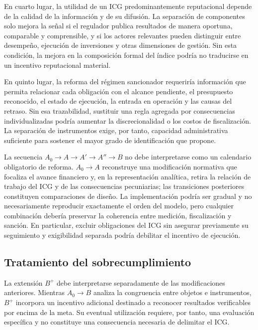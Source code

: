 En cuarto lugar, la utilidad de un ICG predominantemente reputacional depende de la calidad de la información y de su difusión. La separación de componentes solo mejora la señal si el regulador publica resultados de manera oportuna, comparable y comprensible, y si los actores relevantes pueden distinguir entre desempeño, ejecución de inversiones y otras dimensiones de gestión. Sin esta condición, la mejora en la composición formal del índice podría no traducirse en un incentivo reputacional material.

En quinto lugar, la reforma del régimen sancionador requeriría información que permita relacionar cada obligación con el alcance pendiente, el presupuesto reconocido, el estado de ejecución, la entrada en operación y las causas del retraso. Sin esa trazabilidad, sustituir una regla agregada por consecuencias individualizadas podría aumentar la discrecionalidad o los costos de fiscalización. La separación de instrumentos exige, por tanto, capacidad administrativa suficiente para sostener el mayor grado de identificación que propone.

La secuencia \(A_{0}\rightarrow A\rightarrow A'\rightarrow A''\rightarrow B\) no debe interpretarse como un calendario obligatorio de reforma. \(A_{0}\rightarrow A\) reconstruye una modificación normativa que focaliza el avance financiero y, en la representación analítica, retira la relación de trabajo del ICG y de las consecuencias pecuniarias; las transiciones posteriores constituyen comparaciones de diseño. La implementación podría ser gradual y no necesariamente reproducir exactamente el orden del modelo, pero cualquier combinación debería preservar la coherencia entre medición, fiscalización y sanción. En particular, excluir obligaciones del ICG sin asegurar previamente su seguimiento y exigibilidad separada podría debilitar el incentivo de ejecución.


\subsection{Tratamiento del sobrecumplimiento}
\label{subsec:implicancias_bonificacion}

La extensión \(B^{+}\) debe interpretarse separadamente de las modificaciones anteriores. Mientras \(A_{0}\rightarrow B\) analiza la congruencia entre objetos e instrumentos, \(B^{+}\) incorpora un incentivo adicional destinado a reconocer resultados verificables por encima de la meta. Su eventual utilización requiere, por tanto, una evaluación específica y no constituye una consecuencia necesaria de delimitar el ICG.

